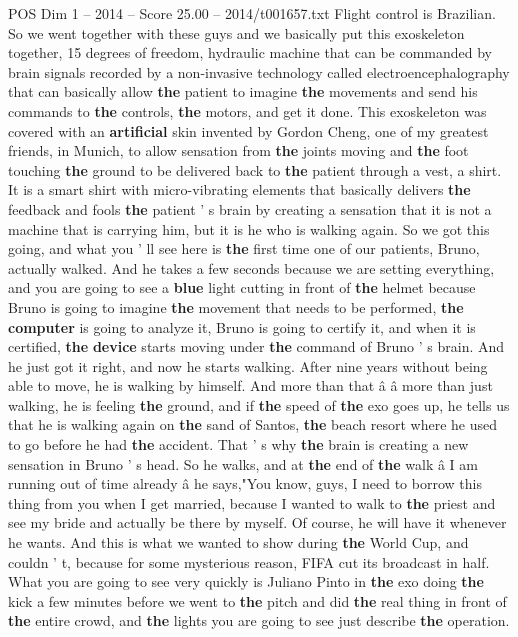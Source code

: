 \begin{textsample}{POS Dim 1 – 2014 – Score 25.00 – 2014/t001657.txt}
Flight control is Brazilian.
So we went together with these guys and we basically put this exoskeleton together, 15 degrees of freedom, hydraulic machine that can be commanded by brain signals recorded by a non-invasive technology called electroencephalography that can basically allow \textbf{the} patient to imagine \textbf{the} movements and send his commands to \textbf{the} controls, \textbf{the} motors, and get it done.
This exoskeleton was covered with an \textbf{artificial} skin invented by Gordon Cheng, one of my greatest friends, in Munich, to allow sensation from \textbf{the} joints moving and \textbf{the} foot touching \textbf{the} ground to be delivered back to \textbf{the} patient through a vest, a shirt.
It is a smart shirt with micro-vibrating elements that basically delivers \textbf{the} feedback and fools \textbf{the} patient ' s brain by creating a sensation that it is not a machine that is carrying him, but it is he who is walking again.
So we got this going, and what you ' ll see here is \textbf{the} first time one of our patients, Bruno, actually walked.
And he takes a few seconds because we are setting everything, and you are going to see a \textbf{blue} light cutting in front of \textbf{the} helmet because Bruno is going to imagine \textbf{the} movement that needs to be performed, \textbf{the} \textbf{computer} is going to analyze it, Bruno is going to certify it, and when it is certified, \textbf{the} \textbf{device} starts moving under \textbf{the} command of Bruno ' s brain.
And he just got it right, and now he starts walking.
After nine years without being able to move, he is walking by himself.
And more than that â â more than just walking, he is feeling \textbf{the} ground, and if \textbf{the} speed of \textbf{the} exo goes up, he tells us that he is walking again on \textbf{the} sand of Santos, \textbf{the} beach resort where he used to go before he had \textbf{the} accident.
That ' s why \textbf{the} brain is creating a new sensation in Bruno ' s head.
So he walks, and at \textbf{the} end of \textbf{the} walk â I am running out of time already â he says,"You know, guys, I need to borrow this thing from you when I get married, because I wanted to walk to \textbf{the} priest and see my bride and actually be there by myself.
Of course, he will have it whenever he wants.
And this is what we wanted to show during \textbf{the} World Cup, and couldn ' t, because for some mysterious reason, FIFA cut its broadcast in half.
What you are going to see very quickly is Juliano Pinto in \textbf{the} exo doing \textbf{the} kick a few minutes before we went to \textbf{the} pitch and did \textbf{the} real thing in front of \textbf{the} entire crowd, and \textbf{the} lights you are going to see just describe \textbf{the} operation.

\end{textsample}
